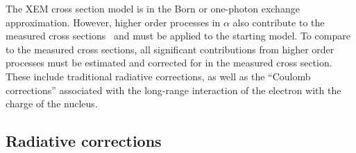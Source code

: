 The XEM cross section model is in the Born or one-photon exchange
approximation. However, higher order processes in $\alpha$ also contribute to
the measured cross sections~\cite{motsai_rc,tsai_rc} and must be applied to
the starting model. To compare to the measured cross sections, all significant
contributions from higher order processes must be estimated and corrected for
in the measured cross section. These include traditional radiative corrections,
as well as the ``Coulomb corrections'' associated with the long-range
interaction of the electron with the charge of the nucleus.


\subsection{Radiative corrections}\label{rc.ssec}



%
%

